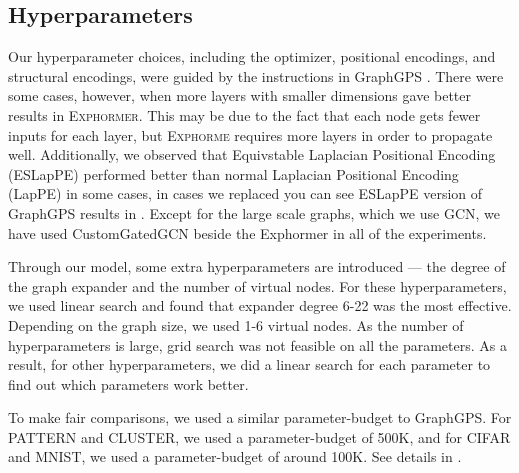 \documentclass{article}
\theoremstyle{plain}
\theoremstyle{definition}
\theoremstyle{remark}
\begin{document}
\subsection{Hyperparameters}
Our hyperparameter choices, including the optimizer, positional encodings, and structural encodings, were guided by the instructions in GraphGPS \citep{RampasekGDLWB22}. There were some cases, however, when more layers with smaller dimensions gave better results in \textsc{Exphormer}. This may be due to the fact that each node gets fewer inputs for each layer, but \textsc{Exphorme} requires more layers in order to propagate well. Additionally, we observed that Equivstable Laplacian Positional Encoding (ESLapPE) performed better than normal Laplacian Positional Encoding (LapPE) in some cases, in cases we replaced you can see ESLapPE version of GraphGPS results in . Except for the large scale graphs, which we use GCN, we have used CustomGatedGCN beside the Exphormer in all of the experiments.

Through our model, some extra hyperparameters are introduced --- the degree of the graph expander and the number of virtual nodes. For these hyperparameters, we used linear search and found that expander degree 6-22 was the most effective. Depending on the graph size, we used 1-6 virtual nodes. As the number of hyperparameters is large, grid search was not feasible on all the parameters. As a result, for other hyperparameters, we did a linear search for each parameter to find out which parameters work better.


To make fair comparisons, we used a similar parameter-budget to GraphGPS. For PATTERN and CLUSTER, we used a parameter-budget of 500K, and for CIFAR and MNIST, we used a parameter-budget of around 100K. See details in .
\end{document}
